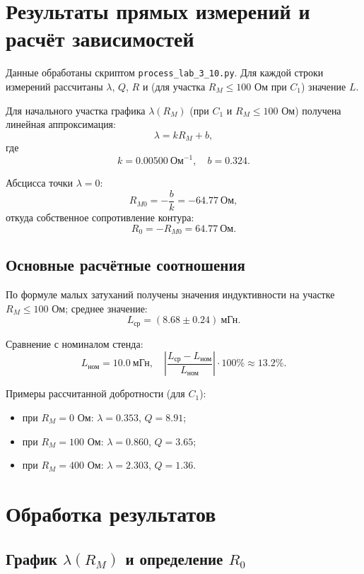 \documentclass[a4paper,14pt]{article}
\begin{document}
\section{Результаты прямых измерений и расчёт зависимостей}

Данные обработаны скриптом \texttt{process\_lab\_3\_10.py}. Для каждой строки измерений рассчитаны $\lambda$, $Q$, $R$ и (для участка $R_M \le 100$ Ом при $C_1$) значение $L$.

Для начального участка графика $\lambda(R_M)$ (при $C_1$ и $R_M\le100$ Ом) получена линейная аппроксимация:
\[
\lambda = kR_M + b,
\]
где
\[
k = 0.00500\ \text{Ом}^{-1}, \quad b = 0.324.
\]

Абсцисса точки $\lambda=0$:
\[
R_{M0} = -\frac{b}{k} = -64.77\ \text{Ом},
\]
откуда собственное сопротивление контура:
\[
R_0 = -R_{M0} = 64.77\ \text{Ом}.
\]

\subsection*{Основные расчётные соотношения}

По формуле малых затуханий получены значения индуктивности на участке $R_M\le100$ Ом; среднее значение:
\[
L_{\text{ср}} = (8.68 \pm 0.24)\ \text{мГн}.
\]

Сравнение с номиналом стенда:
\[
L_{\text{ном}} = 10.0\ \text{мГн},\quad
\left|\frac{L_{\text{ср}}-L_{\text{ном}}}{L_{\text{ном}}}\right|\cdot100\% \approx 13.2\%.
\]

Примеры рассчитанной добротности (для $C_1$):
\begin{itemize}
    \item при $R_M=0$ Ом: $\lambda=0.353$, $Q=8.91$;
    \item при $R_M=100$ Ом: $\lambda=0.860$, $Q=3.65$;
    \item при $R_M=400$ Ом: $\lambda=2.303$, $Q=1.36$.
\end{itemize}

\section{Обработка результатов}

\subsection{График $\lambda(R_M)$ и определение $R_0$}
\end{document}
